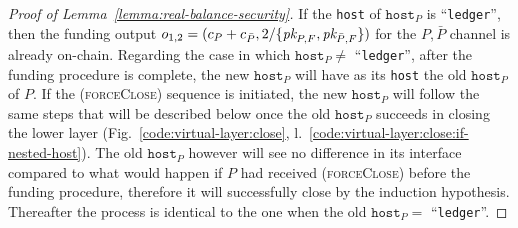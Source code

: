 \begin{proof}[Proof of Lemma~\ref{lemma:real-balance-security}]
  If the \texttt{host} of $\texttt{host}_P$ is ``\texttt{ledger}'', then the funding output
  $o_{1, 2} = (c_P + c_{\bar{P}}, 2/\{\textit{pk}_{P, F}, \textit{pk}_{\bar{P}, F}\})$ for the
  $P, \bar{P}$ channel is already on-chain. Regarding the case in which
  $\texttt{host}_P \neq$ ``\texttt{ledger}'', after the funding procedure is complete, the
  new $\texttt{host}_P$ will have as its \texttt{host} the old $\texttt{host}_P$
  of $P$. If the (\textsc{forceClose}) sequence is initiated, the new
  $\texttt{host}_P$ will follow the same steps that will be described below once
  the old $\texttt{host}_P$ succeeds in closing the lower layer
  (Fig.~\ref{code:virtual-layer:close},
  l.~\ref{code:virtual-layer:close:if-nested-host}). The old $\texttt{host}_P$
  however will see no difference in its interface compared to what would happen
  if $P$ had received (\textsc{forceClose}) before the funding procedure, therefore
  it will successfully close by the induction hypothesis. Thereafter the process
  is identical to the one when the old $\texttt{host}_P =$ ``\texttt{ledger}''.


\end{proof}
